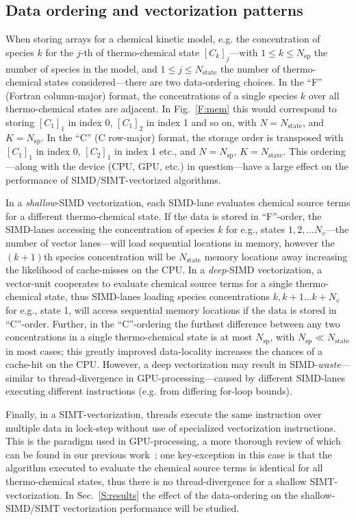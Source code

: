 \documentclass[12pt,number,sort&compress]{elsarticle}
\begin{document}
\subsection{Data ordering and vectorization patterns}
\label{S:data}
When storing arrays for a chemical kinetic model, e.g. the concentration of species $k$ for the $j$-th of thermo-chemical state $[C_k]_j$---with $1 \le k \le N_{\text{sp}}$ the number of species in the model, and $1 \le j \le N_{\text{state}}$ the number of thermo-chemical states considered---there are two data-ordering choices.
In the ``F'' (Fortran column-major) format, the concentrations of a single species $k$ over all thermo-chemical states are adjacent.
In Fig.~\ref{F:mem} this would correspond to storing $[C_1]_1$ in index \num{0}, $[C_1]_2$ in index \num{1} and so on, with $N = N_{\text{state}}$, and $K = N_{\text{sp}}$.
In the ``C'' (C row-major) format, the storage order is transposed with $[C_1]_1$ in index \num{0}, $[C_2]_1$ in index \num{1} etc., and $N = N_{\text{sp}}$, $K = N_{\text{state}}$.
This ordering---along with the device (CPU, GPU, etc.) in question---have a large effect on the performance of SIMD\slash SIMT-vectorized algorithms.

In a \textit{shallow}-SIMD vectorization, each SIMD-lane evaluates chemical source terms for a different thermo-chemical state.
If the data is stored in ``F''-order, the SIMD-lanes accessing the concentration of species $k$ for e.g., states $1, 2,\ldots N_{v}$---the number of vector lanes---will load sequential locations in memory, however the $(k+1)$th species concentration will be $N_{\text{state}}$ memory locations away increasing the likelihood of cache-misses on the CPU.
In a \textit{deep}-SIMD vectorization, a vector-unit cooperates to evaluate chemical source terms for a single thermo-chemical state, thus SIMD-lanes loading species concentrations $k, k+1\ldots k + N_v$ for e.g., state 1, will access sequential memory locations if the data is stored in ``C''-order.
Further, in the ``C''-ordering the furthest difference between any two concentrations in a single thermo-chemical state is at most $N_{\text{sp}}$, with $N_{\text{sp}} \ll N_{\text{state}}$ in most cases; this greatly improved data-locality increases the chances of a cache-hit on the CPU.
However, a deep vectorization may result in SIMD-\textit{waste}---similar to thread-divergence in GPU-processing---caused by different SIMD-lanes executing different instructions (e.g. from differing for-loop bounds).

Finally, in a SIMT-vectorization, threads execute the same instruction over multiple data in lock-step without use of specialized vectorization instructions.
This is the paradigm used in GPU-processing, a more thorough review of which can be found in our previous work~\cite{CurtisGPU:2017}; one key-exception in this case is that the algorithm executed to evaluate the chemical source terms is identical for all thermo-chemical states, thus there is no thread-divergence for a shallow SIMT-vectorization. 
In Sec.~\ref{S:results} the effect of the data-ordering on the shallow-SIMD\slash SIMT vectorization performance will be studied.
\end{document}

